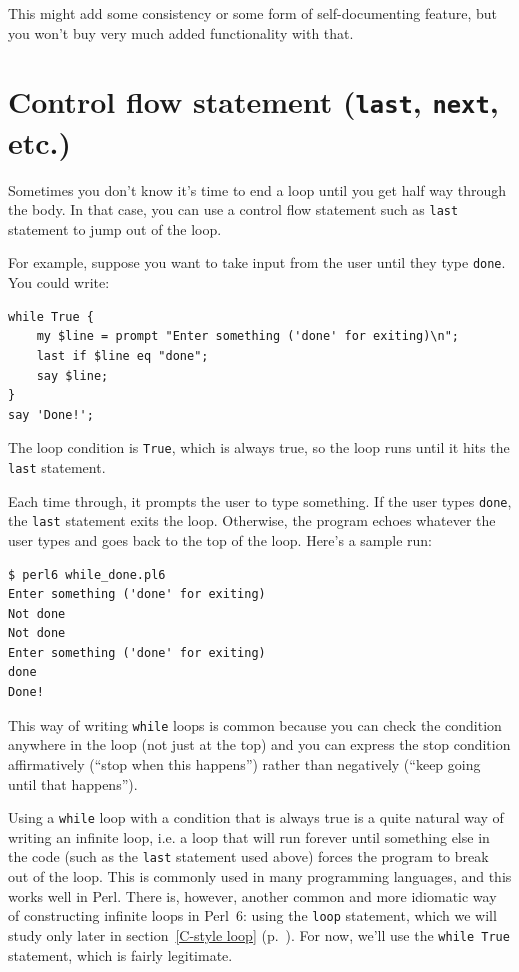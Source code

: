 This might add some consistency or some form of 
self-documenting feature, but you won't buy very much 
added functionality with that.
 

\section{Control flow statement ({\tt last}, {\tt next}, etc.)}

Sometimes you don't know it's time to end a loop until you get half
way through the body.  In that case, you can use a control flow 
statement such as {\tt last} statement to jump out of the loop.

For example, suppose you want to take input from the user until they
type {\tt done}.  You could write:

\begin{verbatim}
while True {
    my $line = prompt "Enter something ('done' for exiting)\n";
    last if $line eq "done";
    say $line;
}
say 'Done!';
\end{verbatim}
%
The loop condition is {\tt True}, which is always true, so the
loop runs until it hits the {\tt last} statement.

Each time through, it prompts the user to type something.
If the user types {\tt done}, the {\tt last} statement exits
the loop.  Otherwise, the program echoes whatever the user types
and goes back to the top of the loop.  Here's a sample run:

\begin{verbatim}
$ perl6 while_done.pl6
Enter something ('done' for exiting)
Not done
Not done
Enter something ('done' for exiting)
done
Done!
\end{verbatim}
%
This way of writing {\tt while} loops is common because you
can check the condition anywhere in the loop (not just at the
top) and you can express the stop condition affirmatively
(``stop when this happens'') rather than negatively (``keep 
going until that happens'').

Using a {\tt while} loop with a condition that is always true 
is a quite natural way of writing an infinite loop, i.e. a 
loop that will run forever until something else in the code 
(such as the {\tt last} statement used above) forces the 
program to break out of the loop. This is commonly used in 
many programming languages, and this works well in Perl. There 
is, however, another common and more idiomatic way of constructing 
infinite loops in Perl~6: using the {\tt loop} statement, 
which we will study only later in section~\ref{C-style loop} 
(p.~\pageref{C-style loop}). For now, we'll use the {\tt while True} 
statement, which is fairly legitimate.

